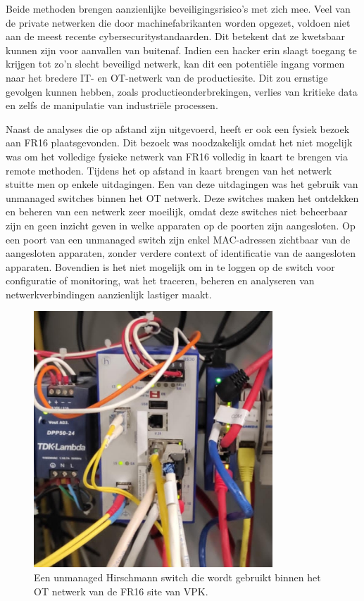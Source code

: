 Beide methoden brengen aanzienlijke beveiligingsrisico’s met zich mee. Veel van de private netwerken die door machinefabrikanten worden opgezet, voldoen niet aan de meest recente cybersecuritystandaarden. Dit betekent dat ze kwetsbaar kunnen zijn voor aanvallen van buitenaf. Indien een hacker erin slaagt toegang te krijgen tot zo’n slecht beveiligd netwerk, kan dit een potentiële ingang vormen naar het bredere IT- en OT-netwerk van de productiesite. Dit zou ernstige gevolgen kunnen hebben, zoals productieonderbrekingen, verlies van kritieke data en zelfs de manipulatie van industriële processen.
\vspace{5mm} 

Naast de analyses die op afstand zijn uitgevoerd, heeft er ook een fysiek bezoek aan FR16 plaatsgevonden. Dit bezoek was noodzakelijk omdat het niet mogelijk was om het volledige fysieke netwerk van FR16 volledig in kaart te brengen via remote methoden. Tijdens het op afstand in kaart brengen van het netwerk stuitte men op enkele uitdagingen. Een van deze uitdagingen was het gebruik van unmanaged switches binnen het OT netwerk. Deze switches maken het ontdekken en beheren van een netwerk zeer moeilijk, omdat deze switches niet beheerbaar zijn en geen inzicht geven in welke apparaten op de poorten zijn aangesloten. Op een poort van een unmanaged switch zijn enkel MAC-adressen zichtbaar van de aangesloten apparaten, zonder verdere context of identificatie van de aangesloten apparaten. Bovendien is het niet mogelijk om in te loggen op de switch voor configuratie of monitoring, wat het traceren, beheren en analyseren van netwerkverbindingen aanzienlijk lastiger maakt.


\begin{figure}[H]
    \centering
    \includegraphics[width=0.8\textwidth]{fotos/hirschmannSwitch.jpg}
    \caption[Hirschmann switch]{\label{fig:grail} Een unmanaged Hirschmann switch die wordt gebruikt binnen het OT netwerk van de FR16 site van VPK.}
\end{figure}


